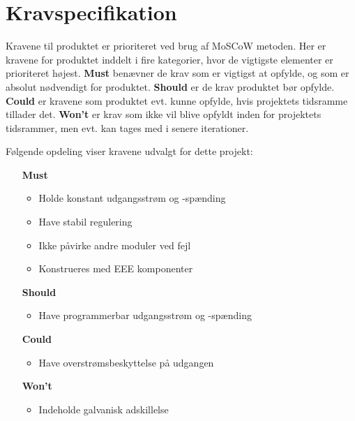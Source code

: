 \chapter{Kravspecifikation}

Kravene til produktet er prioriteret ved brug af MoSCoW metoden. Her er kravene for produktet inddelt i fire kategorier, hvor de vigtigste elementer er prioriteret højest. \textbf{Must} benævner de krav som er vigtigst at opfylde, og som er absolut nødvendigt for produktet. \textbf{Should} er de krav produktet bør opfylde. \textbf{Could} er kravene som produktet evt. kunne opfylde, hvis projektets tidsramme tillader det. \textbf{Won't} er krav som ikke vil blive opfyldt inden for projektets tidsrammer, men evt. kan tages med i senere iterationer.

\noindent Følgende opdeling viser kravene udvalgt for dette projekt:
\begin{itemize}
	\item[\textbf{Must}]
		\begin{itemize}
			\item Holde konstant udgangsstrøm og -spænding
			\item Have stabil regulering
			\item Ikke påvirke andre moduler ved fejl
			\item Konstrueres med EEE komponenter

		\end{itemize}
	\item[\textbf{Should}]
		\begin{itemize}
			\item Have programmerbar udgangsstrøm og -spænding

		\end{itemize}
	\item[\textbf{Could}] 
		\begin{itemize}
			\item Have overstrømsbeskyttelse på udgangen

		\end{itemize}
	\item[\textbf{Won't}]
		\begin{itemize}
			\item Indeholde galvanisk adskillelse
		\end{itemize}
\end{itemize}


